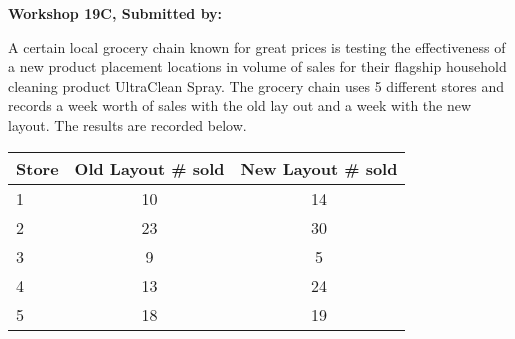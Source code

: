 \documentclass[11pt]{book}\usepackage[]{graphicx}\usepackage[]{color}
\begin{document}
\begin{exercises}
\begin{exercise}
\end{exercise}
\begin{solution}  %

\end{solution}

\clearpage

    \begin{exercise}  %

    \begin{center}
\begin{flushleft}\textbf{\large \hfill Workshop 19C, Submitted by: }\end{flushleft}

\end{center}

A certain local grocery chain known for great prices is testing the effectiveness of a new product placement locations in volume of sales for their flagship household cleaning product UltraClean Spray. The grocery chain uses 5 different stores and records a week worth of sales with the old lay out and a week with the new layout. The results are recorded below.

\begin{center}
\begin{tabular}{@{} lcc @{}} \hline
Store &	Old Layout \# sold &	New Layout \# sold \\ \hline
1&	10&	14 \\
2&	23&	30 \\
3&	9&	5 \\
4&	13&	24 \\
5&	18&	19 \\ \hline
\end{tabular}
\end{center}


\end{exercise}
\end{exercises}
\end{document}
